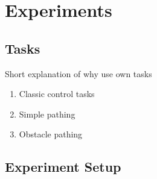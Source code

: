 \section{Experiments}

\subsection{Tasks}
Short explanation of why use own tasks
\begin{enumerate}
	\item Classic control tasks
	\item Simple pathing
	\item Obstacle pathing
\end{enumerate}

\subsection{Experiment Setup}